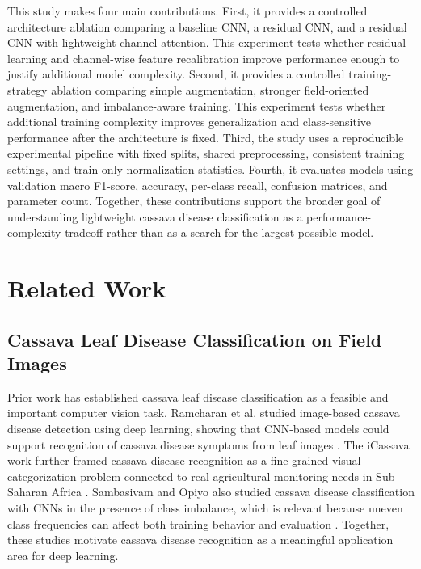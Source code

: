 \documentclass[11pt]{article}
\begin{document}
This study makes four main contributions. First, it provides a controlled architecture ablation comparing a baseline CNN, a residual CNN, and a residual CNN with lightweight channel attention. This experiment tests whether residual learning and channel-wise feature recalibration improve performance enough to justify additional model complexity. Second, it provides a controlled training-strategy ablation comparing simple augmentation, stronger field-oriented augmentation, and imbalance-aware training. This experiment tests whether additional training complexity improves generalization and class-sensitive performance after the architecture is fixed. Third, the study uses a reproducible experimental pipeline with fixed splits, shared preprocessing, consistent training settings, and train-only normalization statistics. Fourth, it evaluates models using validation macro F1-score, accuracy, per-class recall, confusion matrices, and parameter count. Together, these contributions support the broader goal of understanding lightweight cassava disease classification as a performance-complexity tradeoff rather than as a search for the largest possible model.

\section{Related Work}

\subsection{Cassava Leaf Disease Classification on Field Images}

Prior work has established cassava leaf disease classification as a feasible and important computer vision task. Ramcharan et al. studied image-based cassava disease detection using deep learning, showing that CNN-based models could support recognition of cassava disease symptoms from leaf images \cite{ramcharan2017}. The iCassava work further framed cassava disease recognition as a fine-grained visual categorization problem connected to real agricultural monitoring needs in Sub-Saharan Africa \cite{mwebaze2019}. Sambasivam and Opiyo also studied cassava disease classification with CNNs in the presence of class imbalance, which is relevant because uneven class frequencies can affect both training behavior and evaluation \cite{sambasivam2021}. Together, these studies motivate cassava disease recognition as a meaningful application area for deep learning.
\end{document}
